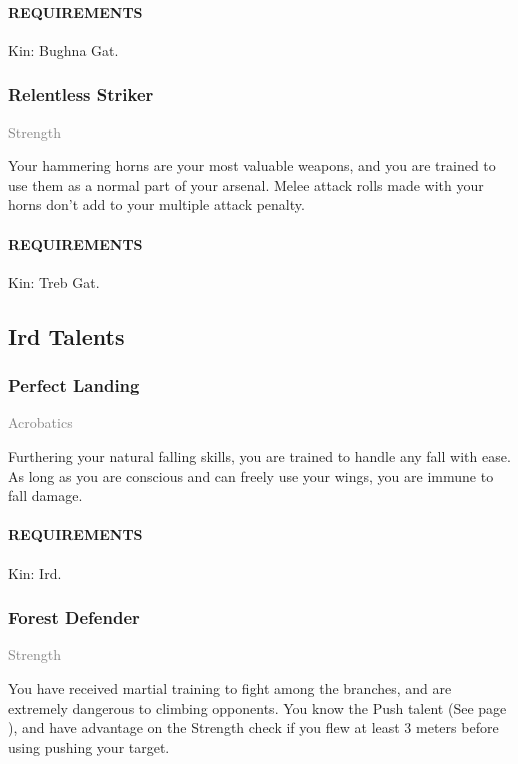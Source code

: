     \paragraph{REQUIREMENTS} Kin: Bughna Gat.

    \subsubsection{Relentless Striker} \label{tal::relentlessstriker}
    \small{\textcolor{gray}{Strength}}

    \normalsize
    Your hammering horns are your most valuable weapons, and you are trained to use them as a normal part of your arsenal.
    Melee attack rolls made with your horns don't add to your multiple attack penalty.
    \paragraph{REQUIREMENTS} Kin: Treb Gat.

\subsection*{Ird Talents}
    \subsubsection{Perfect Landing} \label{tal::perfectlanding}
    \small{\textcolor{gray}{Acrobatics}}

    \normalsize
    Furthering your natural falling skills, you are trained to handle any fall with ease.
    As long as you are conscious and can freely use your wings, you are immune to fall damage.
    \paragraph{REQUIREMENTS} Kin: Ird.

    \subsubsection{Forest Defender} \label{tal::forestdefender}
    \small{\textcolor{gray}{Strength}}

    \normalsize
    You have received martial training to fight among the branches, and are extremely dangerous to climbing opponents.
    You know the Push talent (See page \pageref{tal::push}), and have advantage on the Strength check if you flew at least 3 meters before using pushing your target.
